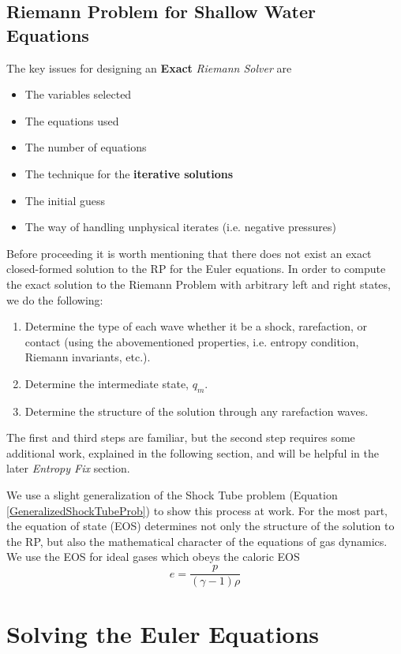 \documentclass[]{article}
\begin{document}
		\subsection{Riemann Problem for Shallow Water Equations}
			The key issues for designing an \textbf{Exact} \textit{Riemann Solver} are 
			\begin{itemize}
				\item The variables selected
				\item The equations used
				\item The number of equations
				\item The technique for the \textbf{iterative solutions}
				\item The initial guess
				\item The way of handling unphysical iterates (i.e. negative pressures)
			\end{itemize}
			Before proceeding it is worth mentioning that there does not exist an exact closed-formed solution to the RP for the Euler equations. In order to compute the exact solution to the Riemann Problem with arbitrary left and right states, we do the following:
		\begin{enumerate}
			\item Determine the type of each wave whether it be a shock, rarefaction, or contact (using the abovementioned properties, i.e. entropy condition, Riemann invariants, etc.).
			\item Determine the intermediate state, $ q_m $.
			\item Determine the structure of the solution through any rarefaction waves.
		\end{enumerate}
		The first and third steps are familiar, but the second step requires some additional work, explained in the following section, and will be helpful in the later \textit{Entropy Fix} section.
		
		We use a slight generalization of the Shock Tube problem (Equation \ref{GeneralizedShockTubeProb}) to show this process at work. For the most part, the equation of state (EOS) determines not only the structure of the solution to the RP, but also the mathematical character of the equations of gas dynamics. We use the EOS for ideal gases which obeys the caloric EOS 
		\begin{equation}
			e = \frac{p}{(\gamma - 1)\rho}
		\end{equation}
	
\section{Solving the Euler Equations}
	
\end{document}
